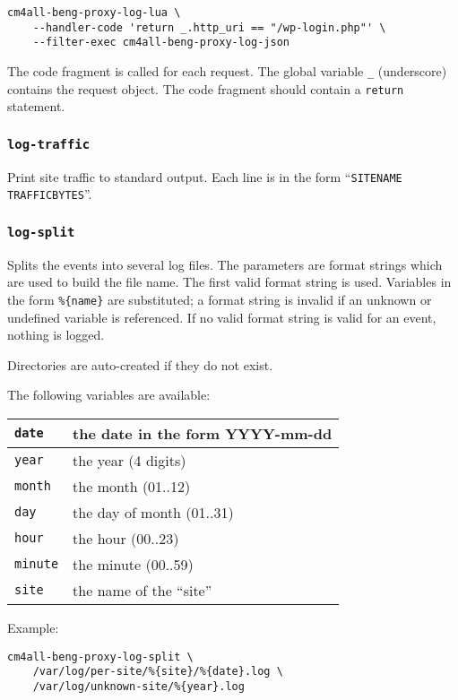 \documentclass[a4paper,12pt]{article}
\begin{document}
\begin{verbatim}
cm4all-beng-proxy-log-lua \
    --handler-code 'return _.http_uri == "/wp-login.php"' \
    --filter-exec cm4all-beng-proxy-log-json
\end{verbatim}

The code fragment is called for each request.  The global variable
\texttt{\_} (underscore) contains the request object.  The code
fragment should contain a \texttt{return} statement.

\subsubsection{\texttt{log-traffic}}

Print site traffic to standard output.  Each line is in the form
``\texttt{SITENAME TRAFFICBYTES}''.

\subsubsection{\texttt{log-split}}

Splits the events into several log files.  The parameters are format
strings which are used to build the file name.  The first valid format
string is used.  Variables in the form \texttt{\%\{name\}} are
substituted; a format string is invalid if an unknown or undefined
variable is referenced.  If no valid format string is valid for an
event, nothing is logged.

Directories are auto-created if they do not exist.

The following variables are available:

\smallskip
\noindent\begin{tabu} {|l|X|}
\hline
\texttt{date} & the date in the form YYYY-mm-dd \\
\hline
\texttt{year} & the year (4 digits) \\
\hline
\texttt{month} & the month (01..12) \\
\hline
\texttt{day} & the day of month (01..31) \\
\hline
\texttt{hour} & the hour (00..23) \\
\hline
\texttt{minute} & the minute (00..59) \\
\hline
\texttt{site} & the name of the ``site'' \\
\hline
\end{tabu}
\smallskip

Example:

\begin{verbatim}
cm4all-beng-proxy-log-split \
    /var/log/per-site/%{site}/%{date}.log \
    /var/log/unknown-site/%{year}.log
\end{verbatim}
\end{document}
